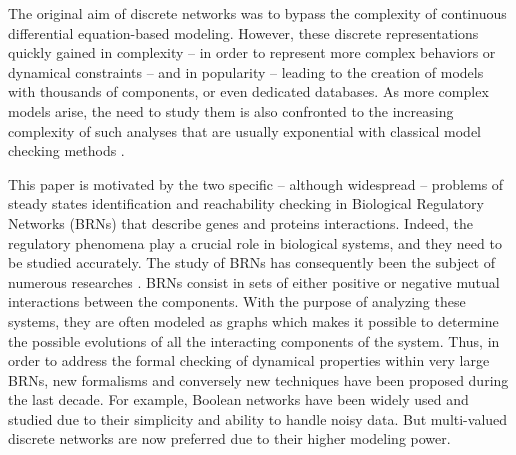 
The original aim of discrete networks \cite{kauffman69,Thomas73} was to bypass the complexity of
continuous differential equation-based modeling.
However, these discrete representations quickly gained in complexity -- in order to represent more complex behaviors or dynamical constraints --
and in popularity -- leading to the creation of models with thousands of components, or even dedicated databases.
As more complex models arise, the need to study them is also confronted to the increasing complexity of such analyses
that are usually exponential with classical model checking methods \cite{Harel02}.

This paper is motivated by the two specific -- although widespread -- problems of steady states identification and reachability checking in Biological Regulatory Networks (BRNs) that describe genes and proteins interactions. Indeed, the regulatory phenomena play a crucial role in biological systems, and they need to be studied accurately. The study of BRNs has consequently been the subject of numerous researches \cite{thieffry1999modularity, shermin20092, rauf2011formal}. BRNs consist in sets of either positive or negative mutual interactions between the components. With the purpose of analyzing these systems, they are often modeled as graphs which makes it possible to determine the possible evolutions of all the interacting components of the system. Thus, in order to address the formal checking of dynamical properties within very large BRNs, new formalisms and conversely new techniques have been proposed during the last decade. For example, Boolean networks \cite{stuart1993origins} have been widely used and studied due to their simplicity and ability to handle noisy data. But multi-valued discrete networks are now preferred due to their higher modeling power.

